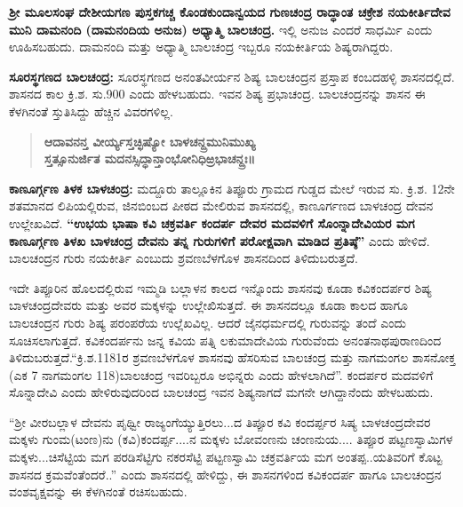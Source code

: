 \textbf{ಶ‍್ರೀ ಮೂಲಸಂಘ ದೇಶೀಯಗಣ ಪುಸ್ತಕಗಚ್ಚ ಕೊಂಡಕುಂದಾನ್ವಯದ ಗುಣಚಂದ್ರ  ರಾದ್ಧಾಂತ ಚಕ್ರೇಶ ನಯಕೀರ್ತಿ\-ದೇವ ಮುನಿ  ದಾಮನಂದಿ  (ದಾಮನಂದಿಯ ಅನುಜ) ಅಧ್ಯಾತ್ಮಿ ಬಾಲಚಂದ್ರ.} ಇಲ್ಲಿ ಅನುಜ ಎಂದರೆ ಸಾಧರ್ಮಿ ಎಂದು ಊಹಿಸಬಹುದು. ದಾಮನಂದಿ ಮತ್ತು ಅಧ್ಯಾತ್ಮಿ ಬಾಲಚಂದ್ರ ಇಬ್ಬರೂ ನಯಕೀರ್ತಿಯ ಶಿಷ್ಯರಾಗಿದ್ದರು.

\textbf{ಸೂರಸ್ಥಗಣದ ಬಾಲಚಂದ್ರ:} ಸೂರಸ್ಥಗಣದ ಅನಂತವೀರ್ಯನ ಶಿಷ್ಯ ಬಾಲಚಂದ್ರನ ಪ್ರಸ್ತಾಪ ಕಂಬದಹಳ್ಳಿ ಶಾಸನದಲ್ಲಿದೆ. ಶಾಸನದ ಕಾಲ ಕ್ರಿ.ಶ. ಸು.900 ಎಂದು ಹೇಳಬಹುದು. ಇವನ ಶಿಷ್ಯ ಪ್ರಭಾಚಂದ್ರ. ಬಾಲಚಂದ್ರನನ್ನು ಶಾಸನ ಈ ಕೆಳಗಿನಂತೆ ಸ್ತುತಿಸಿದ್ದು ಹೆಚ್ಚಿನ ವಿವರಗಳಿಲ್ಲ.

\begin{verse}
\textbf{ಆದಾವನನ್ತ ವೀರ್ಯ್ಯಸ್ತಚ್ಛಿಷ್ಯೋ ಬಾಳಚನ್ದ್ರಮುನಿಮುಖ್ಯ} \\\textbf{ಸ್ತತ್ಸೂನುರ್ಜಿತ ಮದನಸ್ಸಿದ್ಧಾನ್ತಾಂಭೋನಿಧಿಱ್ರಭಾಚನ್ದ್ರಃ॥}
\end{verse}

\textbf{ಕಾಣೂರ್ಗ್ಗಣ ತಿಳಕ ಬಾಳಚಂದ್ರ:} ಮದ್ದೂರು ತಾಲ್ಲೂಕಿನ ತಿಪ್ಪೂರು ಗ್ರಾಮದ ಗುಡ್ಡದ ಮೇಲೆ ಇರುವ ಸು. ಕ್ರಿ.ಶ. 12ನೇ ಶತಮಾನದ ಲಿಪಿಯಲ್ಲಿರುವ, ಜಿನಬಿಂಬದ ಪೀಠದ ಮೇಲಿರುವ ಶಾಸನದಲ್ಲಿ, ಕಾಣೂರ್ಗಣದ ಬಾಳಚಂದ್ರ ದೇವನ ಉಲ್ಲೇಖವಿದೆ. \textbf{“ಉಭಯ ಭಾಷಾ ಕವಿ ಚಕ್ರವರ್ತಿ ಕಂದರ್ಪ ದೇವರ ಮದವಳಿಗೆ ಸೊಂನ್ನಾದೇವಿಯರ ಮಗ ಕಾಣೂರ್ಗ್ಗಣ ತಿಳಖ ಬಾಳಚಂದ್ರ ದೇವನು ತನ್ನ ಗುರುಗಳಿಗೆ ಪರೋಕ್ಷವಾಗಿ ಮಾಡಿದ ಪ್ರತಿಷ್ಠೆ”} ಎಂದು ಹೇಳಿದೆ. ಬಾಲಚಂದ್ರನ ಗುರು ನಯಕೀರ್ತಿ ಎಂಬುದು ಶ್ರವಣಬೆಳಗೊಳ ಶಾಸನದಿಂದ ತಿಳಿದುಬರುತ್ತದೆ.

ಇದೇ ತಿಪ್ಪೂರಿನ ಹೊಲದಲ್ಲಿರುವ ಇಮ್ಮಡಿ ಬಲ್ಲಾಳನ ಕಾಲದ ಇನ್ನೊಂದು ಶಾಸನವು ಕೂಡಾ ಕವಿಕಂದರ್ಪರ ಶಿಷ್ಯ ಬಾಳಚಂದ್ರದೇವರು ಮತ್ತು ಅವರ ಮಕ್ಕಳನ್ನು ಉಲ್ಲೇಖಿಸುತ್ತದೆ. ಈ ಶಾಸನದಲ್ಲೂ ಕೂಡಾ ಕಾಲದ ಹಾಗೂ ಬಾಲಚಂದ್ರನ ಗುರು ಶಿಷ್ಯ ಪರಂಪರೆಯ ಉಲ್ಲೆಖವಿಲ್ಲ. ಆದರೆ ಜೈನಧರ್ಮದಲ್ಲಿ ಗುರುವನ್ನು ತಂದೆ ಎಂದು ಸೂಚಿಸಲಾಗುತ್ತದೆ. ಕವಿಕಂದರ್ಪನು ಜನ್ನ ಕವಿಯ ಪತ್ನಿ ಲಕುಮಾದೇವಿಯ ಗುರುವೆಂದು ಅನಂತನಾಥಪುರಾಣದಿಂದ ತಿಳಿದುಬರುತ್ತದೆ.\break “ಕ್ರಿ.ಶ.1181ರ ಶ್ರವಣಬೆಳಗೊಳ ಶಾಸನವು ಹೆಸರಿಸುವ ಬಾಲಚಂದ್ರ ಮತ್ತು ನಾಗಮಂಗಲ ಶಾಸನೋಕ್ತ (ಎಕ 7 ನಾಗಮಂಗಲ 118)ಬಾಲಚಂದ್ರ ಇವರಿಬ್ಬರೂ ಅಭಿನ್ನರು ಎಂದು ಹೇಳಲಾಗಿದೆ”. ಕಂದರ್ಪರ ಮದವಳಿಗೆ ಸೊನ್ನಾದೇವಿ ಎಂದು ಹೇಳಿರುವುದರಿಂದ ಬಾಲಚಂದ್ರ ಇವನ ಶಿಷ್ಯನಾಗದೆ ಮಗನೇ ಆಗಿದ್ದಾನೆಂದು ಹೇಳಬಹುದು.

“ಶ‍್ರೀ ವೀರಬಲ್ಲಾಳ ದೇವನು ಪೃಥ್ವೀ ರಾಜ್ಯಂಗೆಯ್ಯುತ್ತಿರಲು...ದ ತಿಪ್ಪೂರ ಕವಿ ಕಂದರ್ಪ್ಪರ ಸಿಷ್ಯ ಬಾಳಚಂದ್ರದೇವರ ಮಕ್ಕಳು ಗುಂಮ(ಟಂಣ)ನು (ಕವಿ)ಕಂದರ್ಪ್ಪ....ನ ಮಕ್ಕಳು ಬೋವಂಣನು ಚಂಣನುಯ.... ತಿಪ್ಪೂರ ಪಟ್ಟಣಸ್ವಾಮಿಗಳ ಮಕ್ಕಳು...ಚಿಸೆಟ್ಟಿಯ ಮಗ ಪರಡಿಸೆಟ್ಟಿಗು ನಕರಸೆಟ್ಟಿ ಪಟ್ಟಣಸ್ವಾಮಿ ಚಕ್ರವರ್ತಿಯ ಮಗ ಅಂತಪ್ಪ..ಯತಿವರಿಗೆ ಕೊಟ್ಟ ಶಾಸನದ ಕ್ರಮವೆಂತೆಂದರೆ..” ಎಂದು ಶಾಸನದಲ್ಲಿ ಹೇಳಿದ್ದು, ಈ ಶಾಸನಗಳಿಂದ ಕವಿಕಂದರ್ಪ ಹಾಗೂ ಬಾಲಚಂದ್ರನ ವಂಶವೃಕ್ಷವನ್ನು ಈ ಕೆಳಗಿನಂತೆ ರಚಿಸಬಹುದು.

